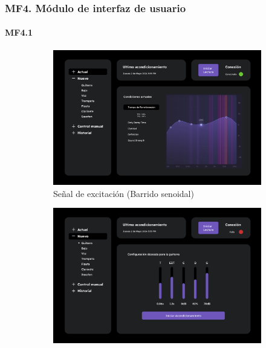 \subsubsection{MF4. Módulo de interfaz de usuario}

\paragraph{MF4.1}

\begin{figure}[!htb]
    \centering
    \begin{subfigure}{0.3\textwidth}
        \centering
        \includegraphics[width=\linewidth]{imagenes/Landing.png}
        \caption{\footnotesize Señal de excitación (Barrido senoidal)}
        \label{fig:sub1}
    \end{subfigure}
    \hfill
    \begin{subfigure}{0.3\textwidth}
        \centering
        \includegraphics[width=\linewidth]{imagenes/Guitarra.png}

\end{subfigure}
\end{figure}

